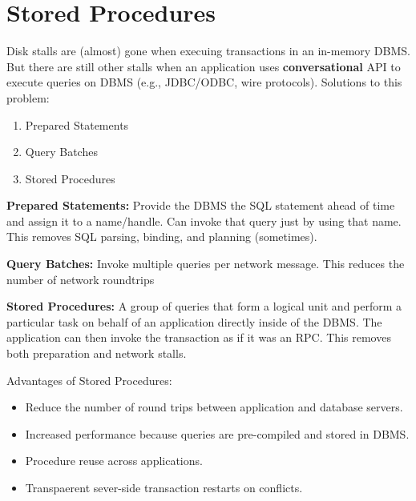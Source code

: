 \documentclass[11pt]{article}
\begin{document}
\maketitle
\thispagestyle{plain}


\section{Stored Procedures}
Disk stalls are (almost) gone when execuing transactions in an in-memory DBMS.
But there are still other stalls when an application uses \textbf{conversational} API to 
execute queries on DBMS (e.g., JDBC/ODBC, wire protocols).
Solutions to this problem:
\begin{enumerate}
    \item Prepared Statements
    \item Query Batches
    \item Stored Procedures
\end{enumerate}

\textbf{Prepared Statements:}
Provide the DBMS the SQL statement ahead of time and assign it to a name/handle.
Can invoke that query just by using that name.
This removes SQL parsing, binding, and planning (sometimes).
        
\textbf{Query Batches:}
Invoke multiple queries per network message.
This reduces the number of network roundtrips
        
\textbf{Stored Procedures:}
A group of queries that form a logical unit and perform a particular task on behalf of an 
application directly inside of the DBMS.
The application can then invoke the transaction as if it was an RPC.
This removes both preparation and network stalls.

Advantages of Stored Procedures:
\begin{itemize}
    \item
    Reduce the number of round trips between application and database servers.
    
    \item
    Increased performance because queries are pre-compiled and stored in DBMS.
    
    \item
    Procedure reuse across applications.
    
    \item
    Transpaerent sever-side transaction restarts on conflicts.
\end{itemize}
\end{document}
